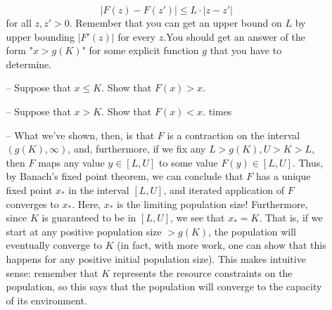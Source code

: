 \documentclass{article}
\begin{document}
\begin{itemize}
\begin{itemize}
        \[|F(z) − F(z')| \leq L \cdot |z - z'|\]
        for all $z, z' > 0$. Remember that you can get an upper bound on $L$ by upper bounding $|F'(z)|$ for every $z$.\newline You should get an answer of the form "$x > g(K)$" for some explicit function $g$ that you have to determine.
        \item[--] Suppose that $x \leq K$. Show that $F(x) > x$.
        \item[--] Suppose that $x > K$. Show that $F(x) < x$. times
        \item[--] What we've shown, then, is that $F$ is a contraction on the interval $(g(K), \infty)$, and, furthermore, if we fix any $L > g(K), U > K > L$, then $F$ maps any value $y \in [L, U]$ to some value $F(y) \in [L, U]$. Thus, by Banach’s fixed point theorem, we can conclude that $F$ has a unique fixed point $x_*$ in the interval $[L, U]$, and iterated application of $F$ converges to $x_*$. Here, $x_*$ is the limiting population size! \newline
        Furthermore, since $K$ is guaranteed to be in $[L, U]$, we see that $x_* = K$. That is, if we start at any positive population size $> g(K)$, the population will eventually converge to $K$ (in fact, with more work, one can show that this happens for any positive initial population size). This makes intuitive sense: remember that $K$ represents the resource constraints on the population, so this says that the population will converge to the capacity of its environment.
    \end{itemize}
\end{itemize}
\end{document}
